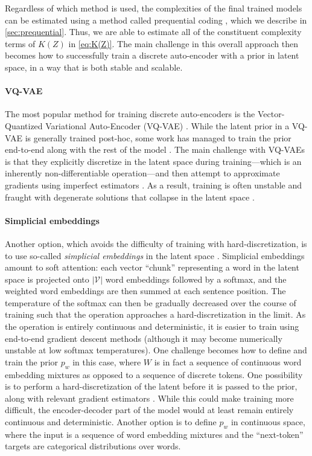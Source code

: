 \documentclass{article}
\begin{document}
\begin{appendices}
Regardless of which method is used, the complexities of the final trained models can be estimated using a method called prequential coding \citep{blier2018description}, which we describe in \cref{sec:prequential}. Thus, we are able to estimate all of the constituent complexity terms of $K(Z)$ in \cref{eq:K(Z)}. The main challenge in this overall approach then becomes how to successfully train a discrete auto-encoder with a prior in latent space, in a way that is both stable and scalable.

\paragraph{VQ-VAE}

The most popular method for training discrete auto-encoders is the Vector-Quantized Variational Auto-Encoder (VQ-VAE) \citep{van2017neural}. While the latent prior in a VQ-VAE is generally trained post-hoc, some work has managed to train the prior end-to-end along with the rest of the model \citep{jones2020discrete,yasuda2021end,cohen2022diffusion}. The main challenge with VQ-VAEs is that they explicitly discretize in the latent space during training---which is an inherently non-differentiable operation---and then attempt to approximate gradients using imperfect estimators \citep{bengio2013estimating,jang2016categorical}. As a result, training is often unstable and fraught with degenerate solutions that collapse in the latent space \citep{lancucki2020robust}.

\paragraph{Simplicial embeddings}

Another option, which avoids the difficulty of training with hard-discretization, is to use so-called \textit{simplicial embeddings} in the latent space \citep{lavoie2023simplicial}. Simplicial embeddings amount to soft attention: each vector ``chunk'' representing a word in the latent space is projected onto $|\mathcal{V}|$ word embeddings followed by a softmax, and the weighted word embeddings are then summed at each sentence position. The temperature of the softmax can then be gradually decreased over the course of training such that the operation approaches a hard-discretization in the limit. As the operation is entirely continuous and deterministic, it is easier to train using end-to-end gradient descent methods (although it may become numerically unstable at low softmax temperatures). One challenge becomes how to define and train the prior $p_w$ in this case, where $W$ is in fact a sequence of continuous word embedding mixtures as opposed to a sequence of discrete tokens. One possibility is to perform a hard-discretization of the latent before it is passed to the prior, along with relevant gradient estimators \citep[e.g.][]{bengio2013estimating,jang2016categorical}. While this could make training more difficult, the encoder-decoder part of the model would at least remain entirely continuous and deterministic. Another option is to define $p_w$ in continuous space, where the input is a sequence of word embedding mixtures and the ``next-token'' targets are categorical distributions over words.


\end{appendices}
\end{document}
